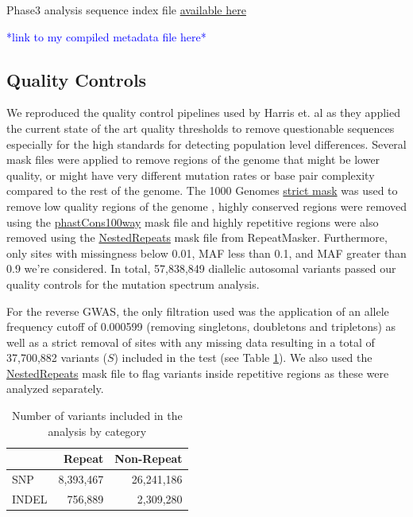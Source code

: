 \documentclass[9pt,lineno]{elife}
\newcommand{\todo}[1]{\textcolor{blue}{*#1*}}
\begin{document}
Phase3 analysis sequence index file  \href{http://ftp.1000genomes.ebi.ac.uk/vol1/ftp/phase3/20130502.phase3.analysis.sequence.index}{available here} 

\todo{link to my compiled metadata file here}

\subsection{Quality Controls}
We reproduced the quality control pipelines used by Harris et. al as they applied the current state of the art quality thresholds to remove questionable sequences especially for the high standards for detecting population level differences. 
Several mask files were applied to remove regions of the genome that might be lower quality, or might have very different mutation rates or base pair complexity compared to the rest of the genome. 
The  1000 Genomes \href{http://ftp.1000genomes.ebi.ac.uk/vol1/ftp/release/20130502/supporting/accessible_genome_masks/20141020.strict_mask.whole_genome.bed}{strict mask} was used to remove low quality regions of the genome , highly conserved regions were removed using the \href{http://hgdownload.cse.ucsc.edu/goldenPath/hg19/database/phastConsElements100way.txt.gz}{phastCons100way} mask file and highly repetitive regions were also removed using the \href{http://hgdownload.cse.ucsc.edu/goldenpath/hg19/database/nestedRepeats.txt.gz}{NestedRepeats} mask file from RepeatMasker. 
Furthermore, only sites with missingness below 0.01, MAF less than 0.1, and MAF greater than 0.9 we're considered.
In total, 57,838,849 diallelic autosomal variants passed our quality controls for the mutation spectrum analysis.

For the reverse GWAS, the only filtration used was the application of an allele frequency cutoff of 0.000599 (removing singletons, doubletons and tripletons) as well as a strict removal of sites with any missing data resulting in a total of 37,700,882 variants ($S$) included in the test (see Table \ref{totTable}). We also used the \href{http://hgdownload.cse.ucsc.edu/goldenpath/hg19/database/nestedRepeats.txt.gz}{NestedRepeats} mask file to flag variants inside repetitive regions as these were analyzed separately.

\begin{table}[h]
\begin{tabular}{l  r r}
                      & {Repeat}  & {Non-Repeat}       \\ \hline
{SNP}  & 8,393,467 & 26,241,186   \\  
{INDEL} &  756,889  & 2,309,280 \\ \hline
\end{tabular}
\caption{Number of variants included in the analysis by category}
\label{totTable}
\end{table}
\end{document}
